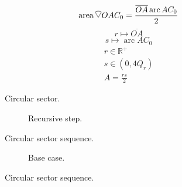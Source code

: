 \documentclass[a4paper,12pt]{report}
\DeclareMathOperator{\arc}{arc}
\DeclareMathOperator{\area}{area}
\newcommand{\circularsector}{%
    \begin{tikzpicture}[baseline=-0.1ex, scale=0.27]
        \draw (0,0) -- (60:1) arc (60:120:1) -- cycle;
    \end{tikzpicture}%
}
\begin{document}
\begin{equation}
\area \circularsector OAC_0 = \frac{\overline{OA} \arc AC_0}{2}
\end{equation}
\begin{equation}
r \mapsto \overline{OA}
\end{equation}
\begin{equation}
s \mapsto \arc AC_0
\end{equation}
\begin{subequations}
\begin{gather}
r \in \mathbb{R}^+ \\
s \in (0, 4Q_r) \\
A = \frac{rs}{2}
\end{gather}
\end{subequations}
\clearpage
\begin{figure}[p]
\centering
\resizebox{\textwidth}{!}{}
\caption{Circular sector.}
\end{figure}
\clearpage
\begin{figure}[p]
\centering
\begin{subfigure}{\textwidth}
\centering
\resizebox{\textwidth}{!}{}
\caption{Recursive step.}
\end{subfigure}
\caption{Circular sector sequence.}
\end{figure}
\clearpage
\begin{figure}[p]
\centering
\ContinuedFloat
\begin{subfigure}{\textwidth}
\centering
\resizebox{\textwidth}{!}{}
\caption{Base case.}
\end{subfigure}
\caption{Circular sector sequence.}
\end{figure}
\clearpage
\end{document}
